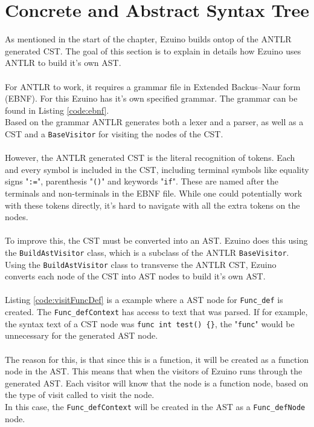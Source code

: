 \section{Concrete and Abstract Syntax Tree}
As mentioned in the start of the chapter, Ezuino builds ontop of the ANTLR generated CST. The goal of this section is to explain in details how Ezuino uses ANTLR to build it's own AST.
\\\\
For ANTLR to work, it requires a grammar file in Extended Backus–Naur form (EBNF). For this Ezuino has it's own specified grammar. The grammar can be found in Listing \ref{code:ebnf}.\\
Based on the grammar ANTLR generates both a lexer and a parser, as well as a CST and a \texttt{BaseVisitor} for visiting the nodes of the CST.
\\\\
However, the ANTLR generated CST is the literal recognition of tokens. Each and every symbol is included in the CST, including terminal symbols like equality signs "\texttt{:=}", parenthesis  "\texttt{()}" and keywords "\texttt{if}". These are named after the terminals and non-terminals in the EBNF file. While one could potentially work with these tokens directly, it's hard to navigate with all the extra tokens on the nodes.
\\\\
To improve this, the CST must be converted into an AST. Ezuino does this using the \texttt{BuildAstVisitor} class, which is a subclass of the ANTLR \texttt{BaseVisitor}. Using the \texttt{BuildAstVisitor} class to transverse the ANTLR CST, Ezuino converts each node of the CST into AST nodes to build it's own AST.
\\\\
Listing \ref{code:visitFuncDef} is a example where a AST node for \texttt{Func\_def} is created. The \texttt{Func\_defContext} has access to text that was parsed. If for example, the syntax text of a CST node was \texttt{func int test() \{\}}, the "\texttt{func}" would be unnecessary for the generated AST node.
\\\\
The reason for this, is that since this is a function, it will be created as a function node in the AST. This means that when the visitors of Ezuino runs through the generated AST. Each visitor will know that the node is a function node, based on the type of visit called to visit the node.\\
In this case, the \texttt{Func\_defContext} will be created in the AST as a \texttt{Func\_defNode} node.
